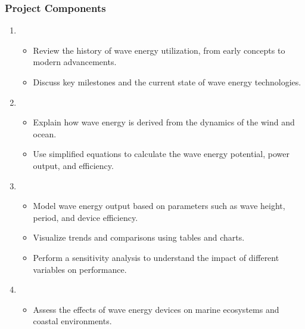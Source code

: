 \documentclass[letterpaper,10pt,english]{jupyterBook}
\begin{document}
\subsubsection{Project Components}
\label{\detokenize{ProjectSyllabus:id29}}\begin{enumerate}
%
\item {} 
\sphinxAtStartPar
{}
\begin{itemize}
\item {} 
\sphinxAtStartPar
Review the history of wave energy utilization, from early concepts to modern advancements.

\item {} 
\sphinxAtStartPar
Discuss key milestones and the current state of wave energy technologies.

\end{itemize}

\item {} 
\sphinxAtStartPar
{}
\begin{itemize}
\item {} 
\sphinxAtStartPar
Explain how wave energy is derived from the dynamics of the wind and ocean.

\item {} 
\sphinxAtStartPar
Use simplified equations to calculate the wave energy potential, power output, and efficiency.

\end{itemize}

\item {} 
\sphinxAtStartPar
{}
\begin{itemize}
\item {} 
\sphinxAtStartPar
Model wave energy output based on parameters such as wave height, period, and device efficiency.

\item {} 
\sphinxAtStartPar
Visualize trends and comparisons using tables and charts.

\item {} 
\sphinxAtStartPar
Perform a sensitivity analysis to understand the impact of different variables on performance.

\end{itemize}

\item {} 
\sphinxAtStartPar
{}
\begin{itemize}
\item {} 
\sphinxAtStartPar
Assess the effects of wave energy devices on marine ecosystems and coastal environments.


\end{itemize}
\end{enumerate}
\end{document}
